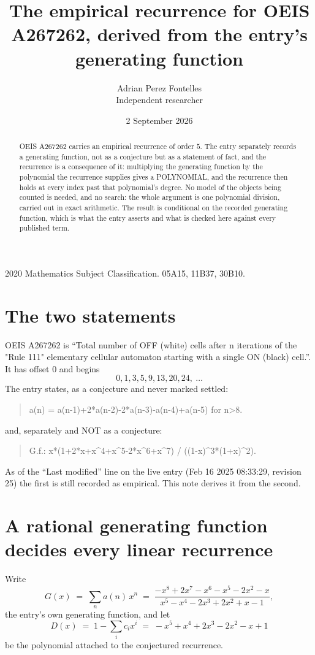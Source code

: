 \documentclass[11pt,a4paper]{article}
\title{The empirical recurrence for OEIS A267262, derived from the entry's generating function}
\author{Adrian Perez Fontelles\\ \small Independent researcher}
\date{2 September 2026}
\theoremstyle{plain}
\theoremstyle{definition}
\begin{document}
\maketitle

\begin{abstract}
OEIS A267262 carries an empirical recurrence of order $5$. The entry separately records a
generating function, not as a conjecture but as a statement of fact, and the recurrence is a
consequence of it: multiplying the generating function by the polynomial the recurrence
supplies gives a POLYNOMIAL, and the recurrence then holds at every index past that
polynomial's degree. No model of the objects being counted is needed, and no search: the
whole argument is one polynomial division, carried out in exact arithmetic. The result is
conditional on the recorded generating function, which is what the entry asserts and what is
checked here against every published term.
\end{abstract}

\noindent\small 2020 Mathematics Subject Classification. 05A15, 11B37, 30B10.\normalsize

\section{The two statements}

OEIS A267262 is ``Total number of OFF (white) cells after n iterations of the "Rule 111" elementary cellular automaton starting with a single ON (black) cell.''. It has offset $0$ and begins
\[
0, 1, 3, 5, 9, 13, 20, 24,\ \dots
\]
The entry states, as a conjecture and never marked settled:
\begin{quote}
a(n) = a(n-1)+2*a(n-2)-2*a(n-3)-a(n-4)+a(n-5) for n>8.
\end{quote}
and, separately and NOT as a conjecture:
\begin{quote}
G.f.: x*(1+2*x+x\^{}4+x\^{}5-2*x\^{}6+x\^{}7) / ((1-x)\^{}3*(1+x)\^{}2).
\end{quote}
As of the ``Last modified'' line on the live entry (Feb 16 2025 08:33:29, revision 25) the first is still
recorded as empirical. This note derives it from the second.

\section{A rational generating function decides every linear recurrence}

Write
\[
G(x)\;=\;\sum_{n}a(n)\,x^{n}\;=\;\frac{- x^{8} + 2 x^{7} - x^{6} - x^{5} - 2 x^{2} - x}{x^{5} - x^{4} - 2 x^{3} + 2 x^{2} + x - 1},
\]
the entry's own generating function, and let
\[
D(x)\;=\;1-\sum_i c_i x^{i}\;=\;- x^{5} + x^{4} + 2 x^{3} - 2 x^{2} - x + 1
\]
be the polynomial attached to the conjectured recurrence.
\end{document}
